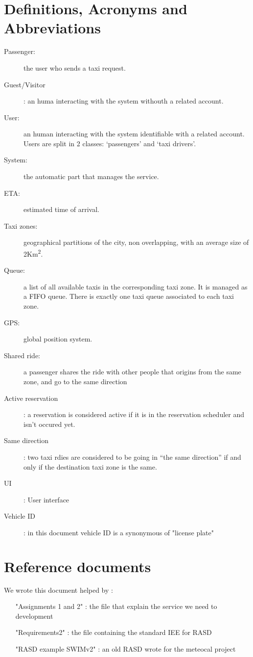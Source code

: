 \section{Definitions, Acronyms and Abbreviations}
\begin{description}
  \item[Passenger:] the user who sends a taxi request.
  \item[Guest/Visitor]: an huma interacting with the system withouth a related account.
  \item[User:] an human interacting with the system identifiable with a related account. Users are split in 2 classes: `passengers' and `taxi drivers'.
  \item[System:] the automatic part that manages the service.
  \item[ETA:] estimated time of arrival.
  \item[Taxi zones:] geographical partitions of the city, non overlapping, with an average size of 2Km\textsuperscript{2}.
  \item[Queue:] a list of all available taxis in the corresponding taxi zone. It is managed as a FIFO queue.
    There is exactly one taxi queue associated to each taxi zone.
  \item[GPS:] global position system.
  \item[Shared ride:] a passenger shares the ride with other people that origins from the same zone, and go to the same direction
  \item[Active reservation]: a reservation is considered active if it is in the reservation scheduler and isn't occured yet.
  \item[Same direction]: two taxi rdies are considered to be going in ``the same direction'' if and only if the destination taxi zone is the same.
  \item [UI]: User interface
  \item[Vehicle ID] : in this document vehicle ID is a synonymous of "license plate"
\end{description}


\section{Reference documents}
We wrote this document helped by :
\begin{itemize}
 \item ["Assignments 1 and 2"]: the file that explain the service we need to development
 \item ["Requirements2"]: the file containing the standard IEE for RASD
 \item ["RASD example SWIMv2"]: an old RASD wrote for the meteocal project
\end{itemize}

